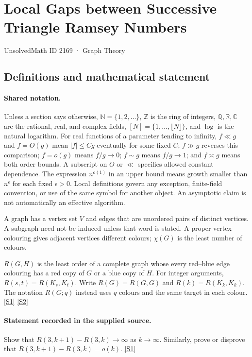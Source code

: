 \documentclass[11pt,a4paper]{article}
\newcommand{\N}{\mathbb{N}}
\newcommand{\Z}{\mathbb{Z}}
\newcommand{\Q}{\mathbb{Q}}
\newcommand{\R}{\mathbb{R}}
\newcommand{\C}{\mathbb{C}}
\newcommand{\sref}[2]{\hyperlink{source:#1:#2}{[S#2]}}
\begin{document}

\setcounter{section}{2168}

\section{Local Gaps between Successive Triangle Ramsey Numbers}\label{2169}

{\small\sffamily UnsolvedMath ID 2169 · Graph Theory}

\subsection{Definitions and mathematical statement}

\paragraph{Shared notation.}Unless a section says otherwise, $\N=\{1,2,\ldots\}$,
$\Z$ is the ring of integers, $\Q,\R,\C$ are the rational, real, and complex
fields, $[N]=\{1,\ldots,\lfloor N\rfloor\}$, and $\log$ is the natural
logarithm. For real functions of a parameter tending to infinity,
$f\ll g$ and $f=O(g)$ mean $|f|\leq Cg$ eventually for some fixed $C$;
$f\gg g$ reverses this comparison; $f=o(g)$ means $f/g\to0$;
$f\sim g$ means $f/g\to1$; and $f\asymp g$ means both order bounds.
A subscript on $O$ or $\ll$ specifies allowed constant dependence.
The expression $n^{o(1)}$ in an upper bound means growth smaller than
$n^\epsilon$ for each fixed $\epsilon>0$. Local definitions govern any
exception, finite-field convention, or use of the same symbol for another
object. An asymptotic claim is not automatically an effective algorithm.



A graph has a vertex set $V$ and edges that are unordered pairs of distinct vertices. A subgraph need not be induced unless that word is stated. A proper vertex colouring gives adjacent vertices different colours; $\chi(G)$ is the least number of colours.

$R(G,H)$ is the least order of a complete graph whose every red--blue edge colouring has a red copy of $G$ or a blue copy of $H$. For integer arguments, $R(s,t)=R(K_s,K_t)$. Write $R(G)=R(G,G)$ and $R(k)=R(K_k,K_k)$. The notation $R(G;q)$ instead uses $q$ colours and the same target in each colour. \sref{2169}{1} \sref{2169}{2}

\paragraph{Statement recorded in the supplied source.}
Show that $ R(3,k+1)-R(3,k)\to\infty $ as $k\to \infty$. Similarly, prove or disprove that $ R(3,k+1)-R(3,k)=o(k). $ \sref{2169}{1}
\end{document}
